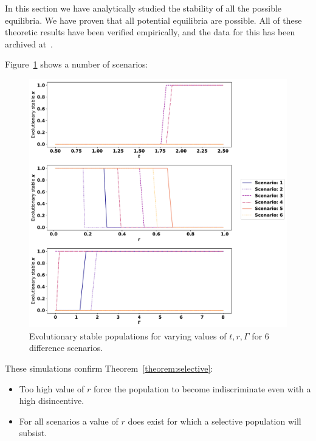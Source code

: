 \documentclass[10pt]{article}
\begin{document}
In this section we have analytically studied the stability of all the possible
equilibria. We have proven that all potential equilibria are possible.  All of
these theoretic results have been verified empirically, and the data for this
has been archived at~\cite{Glynatsi2017}. %

Figure~\ref{fig:convergence-over-r} shows a number of scenarios:

\begin{itemize}
    
\end{itemize}

\begin{figure}[!htbp]
    \includegraphics[width=\textwidth]{images/steady_populations.pdf}
    \caption{Evolutionary stable populations for varying values of \(t, r,
    \Gamma\) for 6 difference scenarios.}
    \label{fig:convergence-over-r}
\end{figure}

These simulations confirm Theorem~\ref{theorem:selective}:


\begin{itemize}
    \item Too high value of \(r\) force the population to become indiscriminate
        even with a high disincentive.
    \item For all scenarios a value of \(r\) does exist for which a selective
        population will subsist.
\end{itemize}
\end{document}
